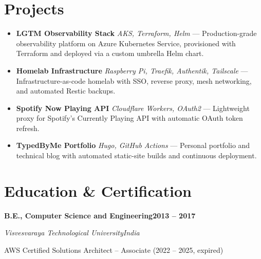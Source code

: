 \documentclass[a4paper,10pt]{article}
\newcommand{\project}[3]{%
  \item \textbf{#1} \textbar{} \textit{#2} --- #3
}
\begin{document}
\section{Projects}
\begin{itemize}
  \project{LGTM Observability Stack}{AKS, Terraform, Helm}{Production-grade observability platform on Azure Kubernetes Service, provisioned with Terraform and deployed via a custom umbrella Helm chart.}
  \project{Homelab Infrastructure}{Raspberry Pi, Traefik, Authentik, Tailscale}{Infrastructure-as-code homelab with SSO, reverse proxy, mesh networking, and automated Restic backups.}
  \project{Spotify Now Playing API}{Cloudflare Workers, OAuth2}{Lightweight proxy for Spotify's Currently Playing API with automatic OAuth token refresh.}
  \project{TypedByMe Portfolio}{Hugo, GitHub Actions}{Personal portfolio and technical blog with automated static-site builds and continuous deployment.}
\end{itemize}

\section{Education \& Certification}
\noindent\textbf{B.E., Computer Science and Engineering}\hfill\textbf{2013 -- 2017}\par
\noindent\textit{Visvesvaraya Technological University}\hfill\textit{India}\par
\noindent AWS Certified Solutions Architect -- Associate (2022 -- 2025, expired)
\end{document}
